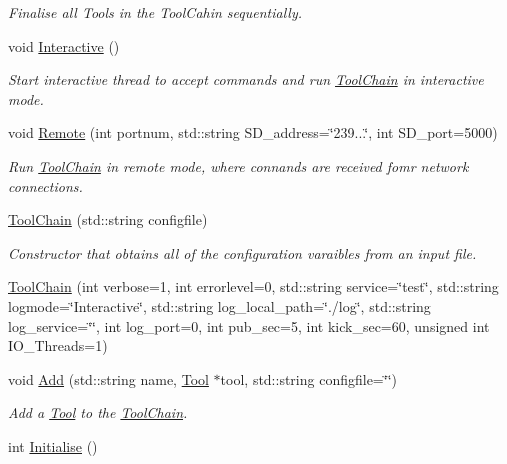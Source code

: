 \begin{DoxyCompactItemize}
\begin{DoxyCompactList}\small\item\em Finalise all Tools in the Tool\-Cahin sequentially. \end{DoxyCompactList}\item 
\hypertarget{classToolChain_a9bb47b83b6b85c3b0fab75af0cda19bf}{void \hyperlink{classToolChain_a9bb47b83b6b85c3b0fab75af0cda19bf}{Interactive} ()}\label{classToolChain_a9bb47b83b6b85c3b0fab75af0cda19bf}

\begin{DoxyCompactList}\small\item\em Start interactive thread to accept commands and run \hyperlink{classToolChain}{Tool\-Chain} in interactive mode. \end{DoxyCompactList}\item 
void \hyperlink{classToolChain_aacc213c07f81ee202dce14856a076df3}{Remote} (int portnum, std\-::string S\-D\-\_\-address=\char`\"{}239...\char`\"{}, int S\-D\-\_\-port=5000)
\begin{DoxyCompactList}\small\item\em Run \hyperlink{classToolChain}{Tool\-Chain} in remote mode, where connands are received fomr network connections. \end{DoxyCompactList}\item 
\hyperlink{classToolChain_a75af494cf7d613290c48fcbcdb700482}{Tool\-Chain} (std\-::string configfile)
\begin{DoxyCompactList}\small\item\em Constructor that obtains all of the configuration varaibles from an input file. \end{DoxyCompactList}\item 
\hyperlink{classToolChain_a82c1596d9d6e233492e29ac83e2f8952}{Tool\-Chain} (int verbose=1, int errorlevel=0, std\-::string service=\char`\"{}test\char`\"{}, std\-::string logmode=\char`\"{}Interactive\char`\"{}, std\-::string log\-\_\-local\-\_\-path=\char`\"{}./log\char`\"{}, std\-::string log\-\_\-service=\char`\"{}\char`\"{}, int log\-\_\-port=0, int pub\-\_\-sec=5, int kick\-\_\-sec=60, unsigned int I\-O\-\_\-\-Threads=1)
\item 
void \hyperlink{classToolChain_a4da0c02154a0597704e58836d6607e61}{Add} (std\-::string name, \hyperlink{classTool}{Tool} $\ast$tool, std\-::string configfile=\char`\"{}\char`\"{})
\begin{DoxyCompactList}\small\item\em Add a \hyperlink{classTool}{Tool} to the \hyperlink{classToolChain}{Tool\-Chain}. \end{DoxyCompactList}\item 
\hypertarget{classToolChain_a341f343926341b82a29c586a7b9683af}{int \hyperlink{classToolChain_a341f343926341b82a29c586a7b9683af}{Initialise} ()}\label{classToolChain_a341f343926341b82a29c586a7b9683af}


\end{DoxyCompactItemize}
